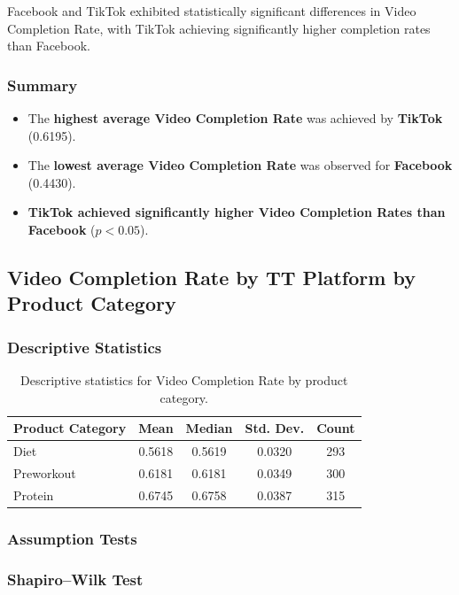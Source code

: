 Facebook and TikTok exhibited statistically significant differences in Video Completion Rate, with TikTok achieving significantly higher completion rates than Facebook.

\subsubsection{Summary}

\begin{itemize}
	\item The \textbf{highest average Video Completion Rate} was achieved by \textbf{TikTok} (0.6195).
	\item The \textbf{lowest average Video Completion Rate} was observed for \textbf{Facebook} (0.4430).
	\item \textbf{TikTok achieved significantly higher Video Completion Rates than Facebook} ($p<0.05$).
\end{itemize}

\subsection{Video Completion Rate by TT Platform by Product Category}
\label{appendix:video_completion_rate_TT_platform_by_product}

\subsubsection{Descriptive Statistics}

\begin{table}[H]
	\centering
	\caption{Descriptive statistics for Video Completion Rate by product category.}
	\begin{tabular}{lcccc}
		\toprule
		Product Category & Mean & Median & Std. Dev. & Count \\
		\midrule
		Diet & 0.5618 & 0.5619 & 0.0320 & 293 \\
		Preworkout & 0.6181 & 0.6181 & 0.0349 & 300 \\
		Protein & 0.6745 & 0.6758 & 0.0387 & 315 \\
		\bottomrule
	\end{tabular}
\end{table}

\subsubsection{Assumption Tests}

\subsubsection{Shapiro--Wilk Test}

